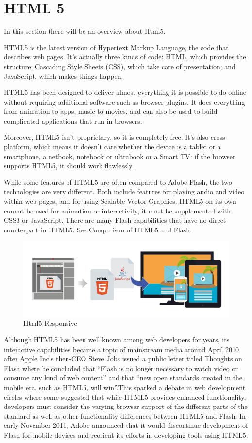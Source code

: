 \section{HTML 5}
\label{sec:TCH_html5}

In this section there will be an overview about Html5.

HTML5 is the latest version of Hypertext Markup Language, the code that describes web pages. It's actually three kinds of code: HTML, which provides the structure; Cascading Style Sheets (CSS), which take care of presentation; and JavaScript, which makes things happen.

HTML5 has been designed to deliver almost everything it is possible to do online without requiring additional software such as browser plugins. It does everything from animation to apps, music to movies, and can also be used to build  complicated applications that run in browsers.

Moreover, HTML5 isn't proprietary, so it is completely free. It's also cross-platform, which means it doesn't care whether the device is  a tablet or a smartphone, a netbook, notebook or ultrabook or a Smart TV: if the browser supports HTML5, it should work flawlessly. 

While some features of HTML5 are often compared to Adobe Flash, the two technologies are very different. Both include features for playing audio and video within web pages, and for using Scalable Vector Graphics. HTML5 on its own cannot be used for animation or interactivity, it must be supplemented with CSS3 or JavaScript. There are many Flash capabilities that have no direct counterpart in HTML5. See Comparison of HTML5 and Flash.

\begin {figure}[h]
\graphicspath{{images/chapter_TCH/}}
\includegraphics[width=\textwidth]{html5_1}
\caption{Html5 Responsive}
\end {figure}

Although HTML5 has been well known among web developers for years, its interactive capabilities became a topic of mainstream media around April 2010 after Apple Inc's then-CEO Steve Jobs issued a public letter titled Thoughts on Flash where he concluded that ``Flash is no longer necessary to watch video or consume any kind of web content'' and that ``new open standards created in the mobile era, such as HTML5, will win''.This sparked a debate in web development circles where some suggested that while HTML5 provides enhanced functionality, developers must consider the varying browser support of the different parts of the standard as well as other functionality differences between HTML5 and Flash. In early November 2011, Adobe announced that it would discontinue development of Flash for mobile devices and reorient its efforts in developing tools using HTML5.
